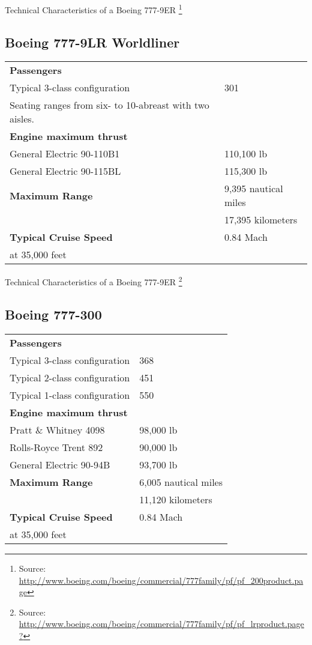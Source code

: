 Technical Characteristics of a Boeing 777-9ER \footnote{Source: \url{http://www.boeing.com/boeing/commercial/777family/pf/pf_200product.page}}

\subsection{Boeing 777-9LR Worldliner}
\begin{tabular}{l l}
\textbf{Passengers} & \\
Typical 3-class configuration & 301 \\
Seating ranges from six- to 10-abreast with two aisles. &\\
\hline
\textbf{Engine maximum thrust} & \\
General Electric 90-110B1 & 110,100 lb \\
General Electric 90-115BL & 115,300 lb\\
\hline
\textbf{Maximum Range} & 9,395 nautical miles \\
& 17,395 kilometers\\
\hline
\textbf {Typical Cruise Speed} & 0.84 Mach \\
at 35,000 feet & \\
\end{tabular}

Technical Characteristics of a Boeing 777-9ER \footnote{Source: \url{http://www.boeing.com/boeing/commercial/777family/pf/pf_lrproduct.page?}}

\subsection{Boeing 777-300}
\begin{tabular}{l l}
\textbf{Passengers} & \\
Typical 3-class configuration & 368 \\
Typical 2-class configuration & 451 \\
Typical 1-class configuration & 550 \\
\hline
\textbf{Engine maximum thrust} & \\
Pratt \& Whitney 4098 & 98,000 lb \\
Rolls-Royce Trent 892 & 90,000 lb \\
General Electric 90-94B & 93,700 lb \\
\hline
\textbf{Maximum Range} & 6,005 nautical miles \\
& 11,120 kilometers\\
\hline
\textbf {Typical Cruise Speed} & 0.84 Mach \\
at 35,000 feet & \\
\end{tabular}

